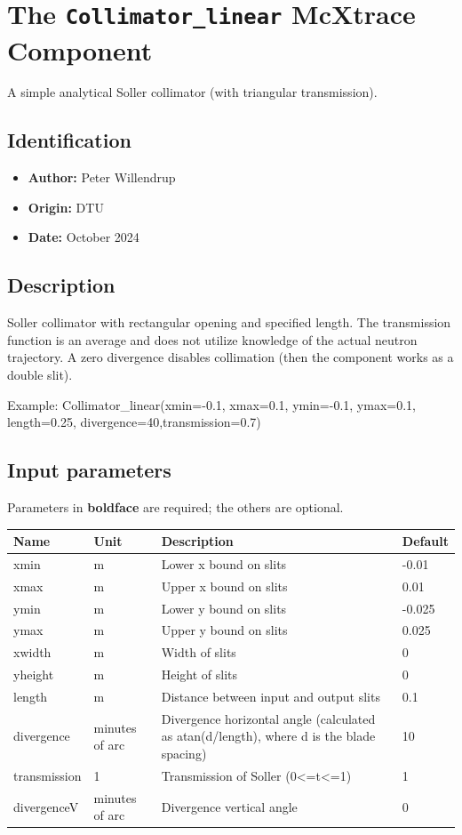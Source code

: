\section{The \texttt{Collimator\_linear} McXtrace Component}
A simple analytical Soller collimator (with triangular transmission).

\subsection*{Identification}
\begin{itemize}
  \item \textbf{Author:} Peter Willendrup
  \item \textbf{Origin:} DTU
  \item \textbf{Date:} October 2024
\end{itemize}

\subsection*{Description}
Soller collimator with rectangular opening and specified length. The transmission function is an average and does not utilize knowledge of the actual neutron trajectory. A zero divergence disables collimation (then the component works as a double slit).

Example: Collimator\_linear(xmin=-0.1, xmax=0.1, ymin=-0.1, ymax=0.1, length=0.25, divergence=40,transmission=0.7)

\subsection*{Input parameters}
Parameters in \textbf{boldface} are required; the others are optional.

\begin{longtable}{p{}p{}p{}p{}}
\toprule
\textbf{Name} & \textbf{Unit} & \textbf{Description} & \textbf{Default} \\
\midrule
\endhead
xmin & m & Lower x bound on slits & -0.01 \\
xmax & m & Upper x bound on slits & 0.01 \\
ymin & m & Lower y bound on slits & -0.025 \\
ymax & m & Upper y bound on slits & 0.025 \\
xwidth & m & Width of slits & 0 \\
yheight & m & Height of slits & 0 \\
length & m & Distance between input and output slits & 0.1 \\
divergence & minutes of arc & Divergence horizontal angle (calculated as atan(d/length), where d is the blade spacing) & 10 \\
transmission & 1 & Transmission of Soller (0\textless{}=t\textless{}=1) & 1 \\
divergenceV & minutes of arc & Divergence vertical angle & 0 \\
\bottomrule
\end{longtable}

